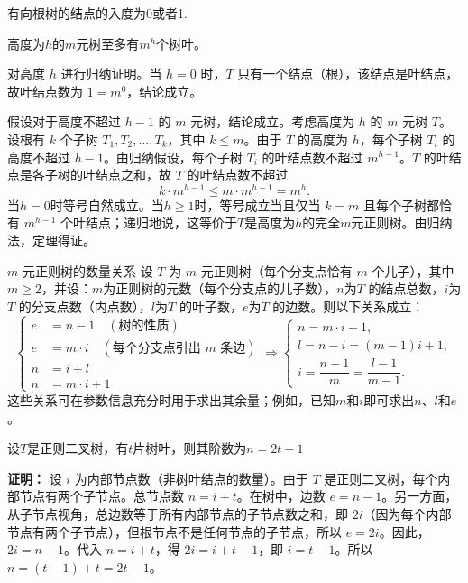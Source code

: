 \documentclass[lang=cn,11pt]{elegantbook}
\begin{document}
有向根树的结点的入度为0或者1.

\begin{theorem}
    高度为$h$的$m$元树至多有$m^h$个树叶。
\end{theorem}
对高度 $h$ 进行归纳证明。当 $h=0$ 时，$T$ 只有一个结点（根），该结点是叶结点，故叶结点数为 $1 = m^0$，结论成立。

假设对于高度不超过 $h-1$ 的 $m$ 元树，结论成立。考虑高度为 $h$ 的 $m$ 元树 $T$。设根有 $k$ 个子树 $T_1, T_2, \dots, T_k$，其中 $k \le m$。由于 $T$ 的高度为 $h$，每个子树 $T_i$ 的高度不超过 $h-1$。由归纳假设，每个子树 $T_i$ 的叶结点数不超过 $m^{h-1}$。$T$ 的叶结点是各子树的叶结点之和，故 $T$ 的叶结点数不超过
    \[
    k \cdot m^{h-1} \le m \cdot m^{h-1} = m^h.
    \]
当$h=0$时等号自然成立。当$h\geqslant1$时，等号成立当且仅当 $k=m$ 且每个子树都恰有 $m^{h-1}$ 个叶结点；递归地说，这等价于$T$是高度为$h$的完全$m$元正则树。由归纳法，定理得证。
\begin{theorem}{$m$ 元正则树的数量关系}
设 $T$ 为 $m$ 元正则树（每个分支点恰有 $m$ 个儿子），其中 $m\geqslant 2$，并设：$m$为正则树的元数（每个分支点的儿子数），$n$为$T$ 的结点总数，$i$为$T$ 的分支点数（内点数），$l$为$T$ 的叶子数，$e$为$T$ 的边数。则以下关系成立：
\[\begin{cases}
    e &= n - 1 \quad (\text{树的性质}) \\[-3pt]
    e &= m \cdot i \quad (\text{每个分支点引出 $m$ 条边}) \\[-3pt]
    n &= i + l \\[-3pt]
    n &= m \cdot i + 1
\end{cases}
\Rightarrow
\begin{cases}
    n = m \cdot i + 1,\\[-3pt]
    l = n - i = (m-1)i + 1,\\
    i = \dfrac{n-1}{m} = \dfrac{l-1}{m-1}.
\end{cases}
\]
这些关系可在参数信息充分时用于求出其余量；例如，已知$m$和$i$即可求出$n$、$l$和$e$。
\end{theorem}
\begin{example}
    设$T$是正则二叉树，有$t$片树叶，则其阶数为$n=2t-1$
\end{example}
\textbf{证明：} 设 $i$ 为内部节点数（非树叶结点的数量）。由于 $T$ 是正则二叉树，每个内部节点有两个子节点。总节点数 $n = i + t$。在树中，边数 $e = n - 1$。另一方面，从子节点视角，总边数等于所有内部节点的子节点数之和，即 $2i$（因为每个内部节点有两个子节点），但根节点不是任何节点的子节点，所以 $e = 2i$。因此，$2i = n - 1$。代入 $n = i + t$，得 $2i = i + t - 1$，即 $i = t - 1$。所以 $n = (t - 1) + t = 2t - 1$。
\end{document}

